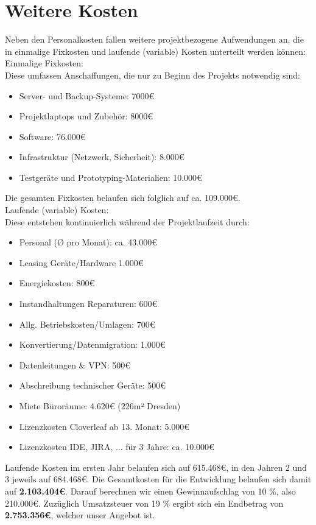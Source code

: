 \section{Weitere Kosten}
Neben den Personalkosten fallen weitere projektbezogene Aufwendungen an, die in einmalige Fixkosten und laufende (variable) Kosten unterteilt werden können:
\\Einmalige Fixkosten:\\
Diese umfassen Anschaffungen, die nur zu Beginn des Projekts notwendig sind:
\begin{itemize}
	\item Server- und Backup-Systeme: 7000€
	\item Projektlaptops und Zubehör: 8000€
	\item Software: 76.000€
	\item Infrastruktur (Netzwerk, Sicherheit): 8.000€
	\item Testgeräte und Prototyping-Materialien: 10.000€
\end{itemize}
Die gesamten Fixkosten belaufen sich folglich auf ca. 109.000€.
\\Laufende (variable) Kosten:\\
Diese entstehen kontinuierlich während der Projektlaufzeit durch:
\begin{itemize}
	\item Personal (Ø pro Monat): ca. 43.000€
	\item Leasing Geräte/Hardware 1.000€
	\item Energiekosten: 800€ 
	\item Instandhaltungen Reparaturen: 600€
	\item Allg. Betriebskosten/Umlagen: 700€
	\item Konvertierung/Datenmigration: 1.000€
	\item Datenleitungen \& VPN: 500€
	\item Abschreibung technischer Geräte: 500€
	\item Miete Büroräume: 4.620€ (226m² Dresden)
	\item Lizenzkosten Cloverleaf ab 13. Monat: 5.000€ 
	\item Lizenzkosten IDE, JIRA, ... für 3 Jahre: ca. 10.000€
\end{itemize}
Laufende Kosten im ersten Jahr belaufen sich auf 615.468€, in den Jahren 2 und 3 jeweils auf 684.468€. 
Die Gesamtkosten für die Entwicklung belaufen sich damit auf \textbf{2.103.404€}. Darauf berechnen wir einen Gewinnaufschlag von 10 \%, also 210.000€. Zuzüglich Umsatzsteuer von 19 \% ergibt sich ein Endbetrag von \textbf{2.753.356€}, welcher unser Angebot ist.

